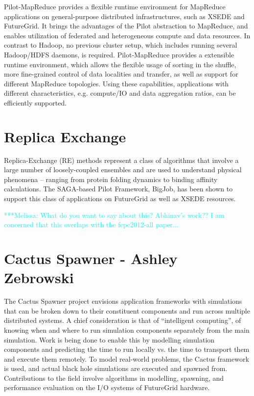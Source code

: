 \documentclass[]{paper}
\newcommand{\mrnote}[1]{ {\textcolor{cyan} { ***Melissa: #1 }}}
\newcommand{\mrnote}[1]{}
\begin{document}
Pilot-MapReduce provides a flexible runtime environment for MapReduce applications on general-purpose distributed infrastructures, such as XSEDE and FutureGrid. It brings the advantages of the Pilot abstraction to MapReduce, and enables utilization of federated and heterogeneous compute and data resources. In contrast to Hadoop, no previous cluster setup, which includes running several Hadoop/HDFS daemons, is required. Pilot-MapReduce provides a extensible runtime environment, which allows the flexible usage of sorting in the shuffle, more fine-grained control of data localities and transfer, as well as support for different MapReduce topologies. Using these capabilities, applications with different characteristics, e.g. compute/IO and data aggregation ratios, can be efficiently supported.



\section{Replica Exchange}

Replica-Exchange (RE) methods represent a class of algorithms that involve a large number of loosely-coupled ensembles 
and are used to understand physical phenomena – ranging from protein folding dynamics to binding affinity calculations. The SAGA-based Pilot Framework, BigJob, has been shown to support this class of applications on FutureGrid as well as XSEDE resources.

\mrnote{What do you want to say about this? Abhinav's work?? I am concerned that this overlaps with the fcpc2012-all paper...}



\section{Cactus Spawner - Ashley Zebrowski}
The Cactus Spawner project envisions application frameworks with simulations that
can be broken down to their constituent components and run across multiple
distributed systems.  A chief consideration is that of ``intelligent computing'',
of knowing when and where to run simulation components separately from the main
simulation.  Work is being done to enable this by modelling simulation components
and predicting the time to run locally vs. the time to transport them and execute
them remotely.  To model real-world problems, the Cactus framework is used, and
actual black hole simulations are executed and spawned from.  Contributions
to the field involve algorithms in modelling, spawning, and performance evaluation on
the I/O systems of FutureGrid hardware.
\end{document}
